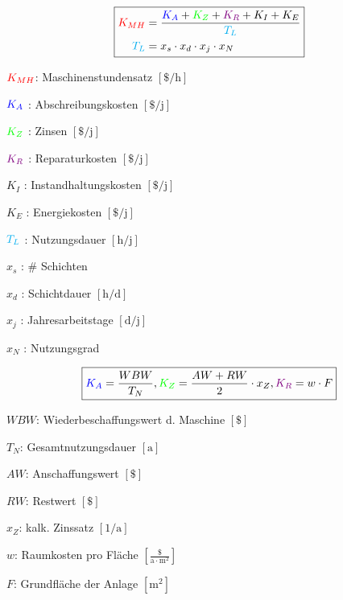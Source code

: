 \begin{tiny}
\[
\boxed{
    \begin{aligned}
        \textcolor{red} {K_{MH}} &= \frac{\textcolor{blue}{K_A} + \textcolor{green}{K_Z} + \textcolor{violet}{K_R} + K_I + K_E}{\textcolor{cyan}{T_L}} \\
        \textcolor{cyan}{T_L} &= x_s \cdot x_d \cdot x_j \cdot x_N
    \end{aligned}
}
\]

\begin{minipage}{0.53\linewidth}
    \item $\textcolor{red} {K_{MH}}$: Maschinenstundensatz $\left[\$\text{/h}\right]$
    \item $\textcolor{blue}{K_A}$ : Abschreibungskosten $\left[\$\text{/j}\right]$
    \item $\textcolor{green}{K_Z}$ : Zinsen $\left[\$\text{/j}\right]$
    \item $\textcolor{violet}{K_R}$ : Reparaturkosten $\left[\$\text{/j}\right]$
    \item $K_I$ : Instandhaltungskosten $\left[\$\text{/j}\right]$
    \item $K_E$ : Energiekosten $\left[\$\text{/j}\right]$
\end{minipage}
\begin{minipage}{0.46\linewidth}
    \item $\textcolor{cyan}{T_L}$ : Nutzungsdauer $\left[\text{h/j}\right]$
    \item $x_s$ : \# Schichten 
    \item $x_d$ : Schichtdauer $\left[\text{h/d}\right]$
    \item $x_j$ : Jahresarbeitstage $\left[\text{d/j}\right]$
    \item $x_N$ : Nutzungsgrad
\end{minipage}
\vspace{1mm}

\[
\boxed{
    \begin{aligned}
        \textcolor{blue}{K_A} = \frac{WBW}{T_N}, 
        \textcolor{green}{K_Z} = \frac{AW + RW}{2} \cdot x_Z, 
        \textcolor{violet}{K_R} = w \cdot F
    \end{aligned}
}
\]

\begin{minipage}{0.45\linewidth}
    \item $WBW$: Wiederbeschaffungswert d. Maschine $\left[\$\right]$
    \item $T_N$: Gesamtnutzungsdauer $\left[\text{a}\right]$
    \item $AW$: Anschaffungswert $\left[\$\right]$
    \item $RW$: Restwert $\left[\$\right]$
    \item $x_Z$: kalk. Zinssatz $\left[1\text{/a}\right]$
\end{minipage}
\begin{minipage}{0.55\linewidth}
    \item $w$: Raumkosten pro Fläche $\left[\frac{\$}{\text{a} \cdot \text{m}^2}\right]$
    \item $F$: Grundfläche der Anlage $\left[\text{m}^2\right]$
\end{minipage}
\vspace{1mm}
\end{tiny}